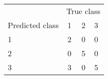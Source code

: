 \begin{tabular}{lccl}
  \hline
  & \multicolumn{3}{c}{True class}\\
 Predicted class & 1 & 2 & 3 \\
   \hline
1 &   2 &   0 &   0 \\ 
  2 &   0 &   5 &   0 \\ 
  3 &   3 &   0 &   5 \\ 
   \hline
\end{tabular}
